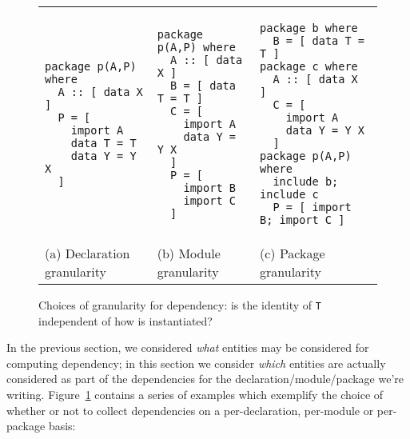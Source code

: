 \documentclass{article}
\begin{document}
\begin{savenotes}
\begin{figure}
    \begin{tabular}{C C C}
\begin{verbatim}
package p(A,P) where
  A :: [ data X ]
  P = [
    import A
    data T = T
    data Y = Y X
  ]
\end{verbatim}
&
\begin{verbatim}
package p(A,P) where
  A :: [ data X ]
  B = [ data T = T ]
  C = [
    import A
    data Y = Y X
  ]
  P = [
    import B
    import C
  ]
\end{verbatim}
&
\begin{verbatim}
package b where
  B = [ data T = T ]
package c where
  A :: [ data X ]
  C = [
    import A
    data Y = Y X
  ]
package p(A,P) where
  include b; include c
  P = [ import B; import C ]
\end{verbatim}
  \\
  (a) Declaration granularity  &
  (b) Module granularity  &
  (c) Package granularity  \\
\end{tabular}
\caption{Choices of granularity for dependency: is the identity of \texttt{T} independent of how  is instantiated?}\label{fig:granularity}
\end{figure}

\end{savenotes}

In the previous section, we considered \emph{what} entities may be considered for
computing dependency; in this section we consider \emph{which} entities are actually
considered as part of the dependencies for the declaration/module/package we're writing.
Figure~\ref{fig:granularity} contains a series of examples which exemplify the choice
of whether or not to collect dependencies on a per-declaration, per-module or per-package basis:
\end{document}
